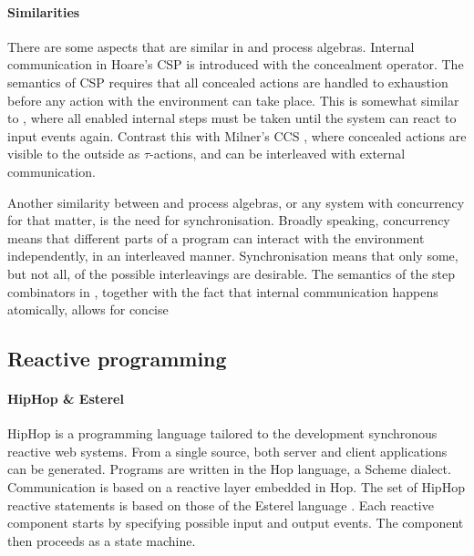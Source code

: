 \paragraph{Similarities}
There are some aspects that are similar in \TOPHAT and process algebras.
Internal communication in Hoare's CSP \cite{books/Hoare85CSP} is introduced with the concealment operator.
The semantics of CSP requires that all concealed actions are handled to exhaustion before any action with the environment can take place.
This is somewhat similar to \TOPHAT, where all enabled internal steps must be taken until the system can react to input events again.
Contrast this with Milner's CCS \cite{books/Milner89CAC}, where concealed actions are visible to the outside as $\tau$-actions, and can be interleaved with external communication.

Another similarity between \TOPHAT and process algebras, or any system with concurrency for that matter, is the need for synchronisation.
Broadly speaking, concurrency means that different parts of a program can interact with the environment independently, in an interleaved manner.
Synchronisation means that only some, but not all, of the possible interleavings are desirable.
The semantics of the step combinators in \TOPHAT, together with the fact that internal communication happens atomically, allows for concise 



\subsection{Reactive programming}

\paragraph{HipHop \& Esterel}

HipHop \cite{berry2011hiphop,journals/corr/BerryS13} is a programming language tailored to the development synchronous reactive web systems.
From a single source, both server and client applications can be generated.
Programs are written in the Hop language, a Scheme dialect.
Communication is based on a reactive layer embedded in Hop.
The set of HipHop reactive statements is based on those of the Esterel language \cite{boussinot1991esterel,journals/scp/BerryG92}.
Each reactive component starts by specifying possible input and output events.
The component then proceeds as a state machine.

